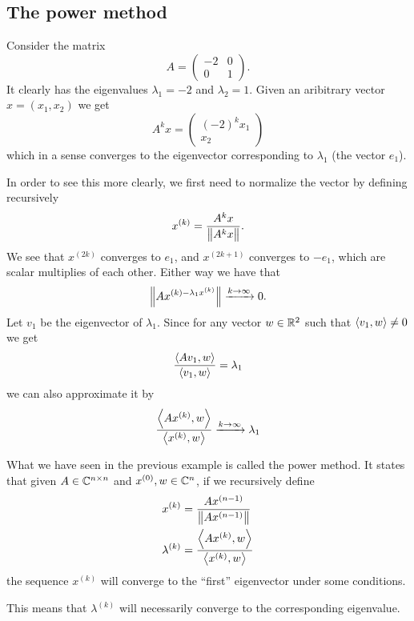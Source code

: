 \documentclass[11pt,a4paper]{article}
\begin{document}

\subsection{The power method}
\begin{example}
  Consider the matrix
  \[
    A = \begin{pmatrix}
      -2 & 0 \\
      0 & 1
    \end{pmatrix}.
  \]
  It clearly has the eigenvalues $\lambda_1 = -2$ and $\lambda_2 = 1$.
  Given an aribitrary vector $x = (x_1, x_2)$ we get
  \[
    A^k x =
    \begin{pmatrix}
      (-2)^k x_1 \\
      x_2
    \end{pmatrix}
  \]
  which in a sense converges to the eigenvector corresponding to $\lambda_1$
  (the vector $e_1$).

  In order to see this more clearly, we first need to normalize the vector
  by defining recursively
  \[
    x^{(k)} = \frac{A^k x}{\left\lVert A^k x\right\rVert}.
  \]
  We see that $x^{(2k)}$ converges to $e_1$,
  and $x^{(2k+1)}$ converges to $-e_1$,
  which are scalar multiplies of each other.
  Either way we have that
  \[
    \left\lVert A x^{(k) - \lambda_1 x^{(k)}}\right\rVert \xrightarrow{k \to \infty} 0.
  \]
  Let $v_1$ be the eigenvector of $\lambda_1$.
  Since for any vector $w \in \mathbb{R}^2$ such that $\left\langle v_1, w \right\rangle \neq 0$ we get
  \[
    \frac{\left\langle A v_1, w \right\rangle}{\left\langle v_1, w \right\rangle} = \lambda_1
  \]
  we can also approximate it by
  \[
    \frac{\left\langle A x^{(k)}, w \right\rangle}{\left\langle x^{(k)}, w \right\rangle} \xrightarrow{k \to \infty} \lambda_1
  \]
\end{example}

What we have seen in the previous example is called the power method.
It states that given $A \in \mathbb{C}^{n \times n}$ and $x^{(0)}, w \in \mathbb{C}^{n}$,
if we recursively define
\begin{align*}
  x^{(k)} &= \frac{A x^{(n-1)}}{\left\lVert A x^{(n-1)}\right\rVert} \\
  \lambda^{(k)} &= \frac{\left\langle A x^{(k)}, w \right\rangle}{\left\langle x^{(k)}, w \right\rangle}
\end{align*}
the sequence $x^{(k)}$ will converge to the ``first'' eigenvector
under some conditions.
\begin{remark}
  This means that $\lambda^{(k)}$ will necessarily converge to the
  corresponding eigenvalue.
\end{remark}
\end{document}
